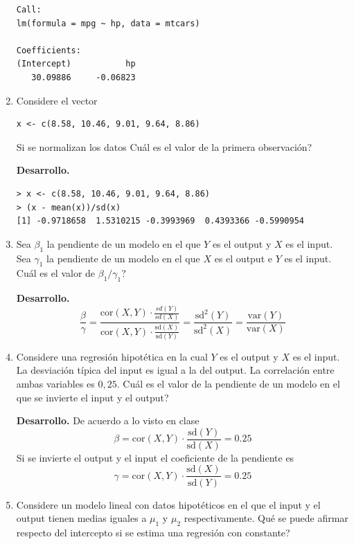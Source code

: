 \documentclass[11pt,oneside,spanish]{article}
\theoremstyle{definition}
\theoremstyle{definition}\newtheorem{definicion}{Definicin}
\theoremstyle{definition}\newtheorem{ejemplo}{Ejemplo}
\theoremstyle{remark}\newtheorem{nota}{\textsc{Nota}}
\theoremstyle{definition}\newtheorem{proposicion}{Proposicin}
\theoremstyle{definition}\newtheorem{problema}{Problema}
\begin{document}
\begin{enumerate}[(1)]
\begin{lstlisting}[backgroundcolor=\color{Gray!20},frame=none,basicstyle=\ttfamily]
Call:
lm(formula = mpg ~ hp, data = mtcars)

Coefficients:
(Intercept)           hp  
   30.09886     -0.06823
\end{lstlisting}


\item Considere el vector 
\begin{lstlisting}[backgroundcolor=\color{Gray!20},frame=none,basicstyle=\ttfamily]
 x <- c(8.58, 10.46, 9.01, 9.64, 8.86)
\end{lstlisting}
Si se normalizan los datos {\textquestiondown}Cu\'al es el valor de la primera observaci\'on?	

\newpage

\textbf{Desarrollo.}
\begin{lstlisting}[backgroundcolor=\color{Gray!20},frame=none,basicstyle=\ttfamily]
> x <- c(8.58, 10.46, 9.01, 9.64, 8.86)
> (x - mean(x))/sd(x)
[1] -0.9718658  1.5310215 -0.3993969  0.4393366 -0.5990954
\end{lstlisting}


\item Sea $\beta_1$ la pendiente de un modelo en el que $Y$ es el output y $X$ es el input. Sea $\gamma_1$ la pendiente de un modelo en el que $X$ es el output e $Y$ es el input. {\textquestiondown}Cu\'al es el valor de $\beta_1 / \gamma_1$?		

\textbf{Desarrollo.}
$$\displaystyle \frac{\beta}{\gamma} = \displaystyle\frac{\text{cor}(X,Y)\cdot \displaystyle \frac{sd(Y)}{sd(X)}}{\text{cor}(X,Y)\cdot \displaystyle \frac{\text{sd}(X)}{\text{sd}(Y)}} = \displaystyle \frac{\text{sd}^2(Y)}{\text{sd}^2(X)} = \displaystyle \frac{\text{var}(Y)}{\text{var}(X)}$$


\item Considere una regresi\'on hipot\'etica en la cual $Y$ es el output y $X$ es el input. La desviaci\'on t\'ipica del input es igual a la del output. La correlaci\'on entre ambas variables es $0,25$. {\textquestiondown}Cu\'al es el valor de la pendiente de un modelo en el que se invierte el input y el output?

\textbf{Desarrollo.}
De acuerdo a lo visto en clase 
$$\beta = \text{cor}(X,Y) \cdot \frac{\text{sd}(Y)}{\text{sd}(X)} =  0.25$$
Si se invierte el output y el input el coeficiente de la pendiente es
$$\gamma = \text{cor}(X,Y) \cdot \frac{\text{sd}(X)}{\text{sd}(Y)} = 0.25$$

		
\item Considere un modelo  lineal con datos hipot\'eticos en el que el input y el output tienen medias iguales a $\mu_1$ y $\mu_2$ respectivamente. {\textquestiondown}Qu\'e se puede afirmar respecto del intercepto si se estima una regresi\'on con constante?		


\end{enumerate}
\end{document}
